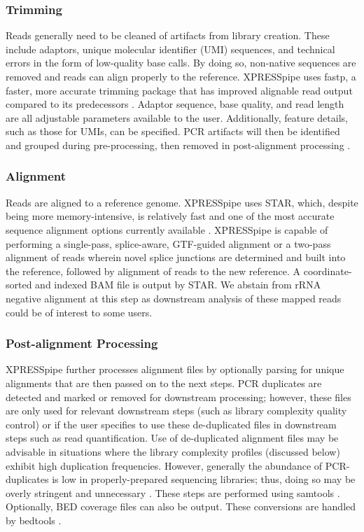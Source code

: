 \documentclass[10pt, oneside]{article}
\begin{document}
\subsubsection{Trimming}
Reads generally need to be cleaned of artifacts from library creation. These include adaptors, unique molecular identifier (UMI) sequences, and technical errors in the form of low-quality base calls. By doing so, non-native sequences are removed and reads can align properly to the reference. XPRESSpipe uses fastp, a faster, more accurate trimming package that has improved alignable read output compared to its predecessors \cite{fastp}. Adaptor sequence, base quality, and read length are all adjustable parameters available to the user. Additionally, feature details, such as those for UMIs, can be specified. PCR artifacts will then be identified and grouped during pre-processing, then removed in post-alignment processing \cite{umi, umitools}.

\subsubsection{Alignment}
Reads are aligned to a reference genome. XPRESSpipe uses STAR, which, despite being more memory-intensive, is relatively fast and one of the most accurate sequence alignment options currently available \cite{star, baruzzo_natmeth}. XPRESSpipe is capable of performing a single-pass, splice-aware, GTF-guided alignment or a two-pass alignment of reads wherein novel splice junctions are determined and built into the reference, followed by alignment of reads to the new reference. A coordinate-sorted and indexed BAM file is output by STAR. We abstain from rRNA negative alignment at this step as downstream analysis of these mapped reads could be of interest to some users.

\subsubsection{Post-alignment Processing}
XPRESSpipe further processes alignment files by optionally parsing for unique alignments that are then passed on to the next steps. PCR duplicates are detected and marked or removed for downstream processing; however, these files are only used for relevant downstream steps (such as library complexity quality control) or if the user specifies to use these de-duplicated files in downstream steps such as read quantification. Use of de-duplicated alignment files may be advisable in situations where the library complexity profiles (discussed below) exhibit high duplication frequencies. However, generally the abundance of PCR-duplicates is low in properly-prepared sequencing libraries; thus, doing so may be overly stringent and unnecessary \cite{umi}. These steps are performed using samtools \cite{samtools}. Optionally, BED coverage files can also be output. These conversions are handled by bedtools \cite{bedtools}.
\end{document}
